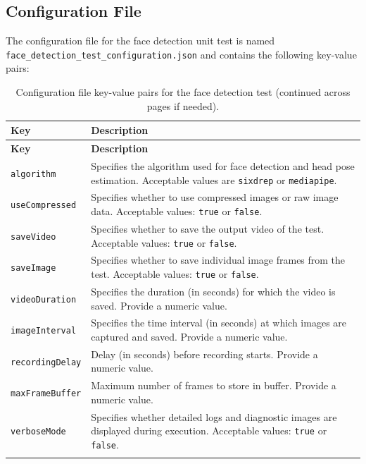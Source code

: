 \documentclass{CSSRforAfrica}
\begin{document}
{\subsection*{Configuration File}
The configuration file for the face detection unit test is named \\
\texttt{face\_detection\_test\_configuration.json} and contains the following key-value pairs:

\begin{longtable}{|p{3.5cm}|p{11.0cm}|}
	\hline
	\rowcolor{blue!20}
	\textbf{Key} & \textbf{Description} \\
	\hline
	\endfirsthead
	
	\hline
	\rowcolor{blue!20}
	\textbf{Key} & \textbf{Description} \\
	\hline
	\endhead
	
	\texttt{algorithm} & Specifies the algorithm used for face detection and head pose estimation. Acceptable values are \texttt{sixdrep} or \texttt{mediapipe}. \\
	\hline
	\texttt{useCompressed} & Specifies whether to use compressed images or raw image data. Acceptable values: \texttt{true} or \texttt{false}. \\
	\hline
	\texttt{saveVideo} & Specifies whether to save the output video of the test. Acceptable values: \texttt{true} or \texttt{false}. \\
	\hline
	\texttt{saveImage} & Specifies whether to save individual image frames from the test. Acceptable values: \texttt{true} or \texttt{false}. \\
	\hline
	\texttt{videoDuration} & Specifies the duration (in seconds) for which the video is saved. Provide a numeric value. \\
	\hline
	\texttt{imageInterval} & Specifies the time interval (in seconds) at which images are captured and saved. Provide a numeric value. \\
	\hline
	\texttt{recordingDelay} & Delay (in seconds) before recording starts. Provide a numeric value. \\
	\hline
	\texttt{maxFrameBuffer} & Maximum number of frames to store in buffer. Provide a numeric value. \\
	\hline
	\texttt{verboseMode} & Specifies whether detailed logs and diagnostic images are displayed during execution. Acceptable values: \texttt{true} or \texttt{false}. \\
	\hline
	
	\caption{Configuration file key-value pairs for the face detection test (continued across pages if needed).}
	\label{tab:face_detection_config}
\end{longtable}


}
\end{document}
